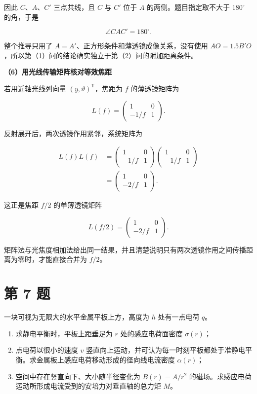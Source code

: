 \documentclass[12pt,a4paper,UTF8]{ctexart}
\newcommand{\tightlist}{\setlength{\itemsep}{0pt}\setlength{\parskip}{0pt}}
\begin{document}
因此 \(C\)、\(A\)、\(C'\) 三点共线，且 \(C\) 与 \(C'\) 位于 \(A\)
的两侧。题目指定取不大于 \(180^\circ\) 的角，于是

\[
\boxed{\angle CAC'=180^\circ}.
\tag{35}
\]

整个推导只用了 \(A=A'\)、正方形条件和薄透镜成像关系，没有使用
\(AO=1.5B'O\)，所以第（1）问的结论确实独立于第（2）问的附加距离条件。

\textbf{（6）用光线传输矩阵核对等效焦距}

若用近轴光线列向量 \((y,\vartheta)^{\mathsf T}\)，焦距为 \(f\)
的薄透镜矩阵为

\[
L(f)=
\begin{pmatrix}
1&0\\
-1/f&1
\end{pmatrix}.
\tag{36}
\]

反射展开后，两次透镜作用紧邻，系统矩阵为

\[
\begin{aligned}
L(f)L(f)
&=
\begin{pmatrix}
1&0\\
-1/f&1
\end{pmatrix}
\begin{pmatrix}
1&0\\
-1/f&1
\end{pmatrix}\\
&=
\begin{pmatrix}
1&0\\
-2/f&1
\end{pmatrix}.
\end{aligned}
\tag{37}
\]

这正是焦距 \(f/2\) 的单薄透镜矩阵

\[
L(f/2)=
\begin{pmatrix}
1&0\\
-2/f&1
\end{pmatrix}.
\]

矩阵法与光焦度相加法给出同一结果，并且清楚说明只有两次透镜作用之间传播距离为零时，才能直接合并为
\(f/2\)。

\newpage

\section{第 7 题}\label{ux7b2c-7-ux9898}

一块可视为无限大的水平金属平板上方，高度为 \(h\) 处有一点电荷 \(q\)。

\begin{enumerate}
\def\labelenumi{\arabic{enumi}.}
\tightlist
\item
  求静电平衡时，平板上距垂足为 \(r\) 处的感应电荷面密度 \(\sigma(r)\)；
\item
  点电荷以很小的速度 \(v\)
  竖直向上运动，并可认为每一时刻平板都处于准静电平衡。求金属板上感应电荷移动形成的径向线电流密度
  \(\alpha(r)\)；
\item
  空间中存在竖直向下、大小随半径变化为 \(B(r)=A/r^2\)
  的磁场。求感应电荷运动所形成电流受到的安培力对垂直轴的总力矩 \(M\)。
\end{enumerate}
\end{document}
